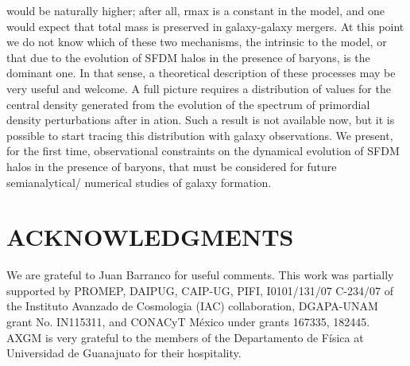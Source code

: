 \documentclass[9.5pt, twocolumn]{article}
\begin{document}
would be naturally higher; after all, rmax is a constant
in the model, and one would expect that total mass is
preserved in galaxy-galaxy mergers. At this point we do
not know which of these two mechanisms, the intrinsic to
the model, or that due to the evolution of SFDM halos
in the presence of baryons, is the dominant one. In that
sense, a theoretical description of these processes may be
very useful and welcome.
A full picture requires a distribution of values for the
central density generated from the evolution of the spectrum
of primordial density perturbations after in
ation.
Such a result is not available now, but it is possible to
start tracing this distribution with galaxy observations.
We present, for the first time, observational constraints
on the dynamical evolution of SFDM halos in the presence
of baryons, that must be considered for future semianalytical/
numerical studies of galaxy formation.

\section {\centering ACKNOWLEDGMENTS}
We are grateful to Juan Barranco for useful comments.
This work was partially supported by PROMEP, DAIPUG,
CAIP-UG, PIFI, I0101/131/07 C-234/07 of the Instituto
Avanzado de Cosmologia (IAC) collaboration,
DGAPA-UNAM grant No. IN115311, and CONACyT
México under grants 167335, 182445. AXGM is very
grateful to the members of the Departamento de Física
at Universidad de Guanajuato for their hospitality.

\clearpage



\end{document}
